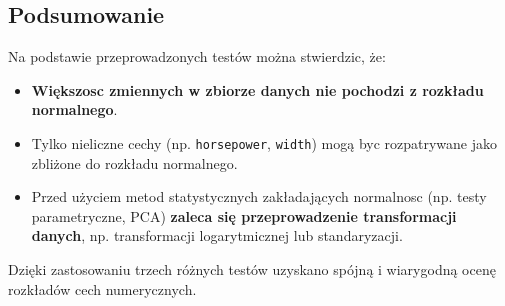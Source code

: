 \documentclass[12pt,a4paper]{article}
\begin{document}
\subsection{Podsumowanie}

Na podstawie przeprowadzonych testów można stwierdzic, że:

\begin{itemize}
    \item \textbf{Większosc zmiennych w zbiorze danych nie pochodzi z rozkładu normalnego}.
    \item Tylko nieliczne cechy (np. \texttt{horsepower}, \texttt{width}) mogą byc rozpatrywane jako zbliżone do rozkładu normalnego.
    \item Przed użyciem metod statystycznych zakładających normalnosc (np. testy parametryczne, PCA) \textbf{zaleca się przeprowadzenie transformacji danych}, np. transformacji logarytmicznej lub standaryzacji.
\end{itemize}

Dzięki zastosowaniu trzech różnych testów uzyskano spójną i wiarygodną ocenę rozkładów cech numerycznych.
\end{document}

